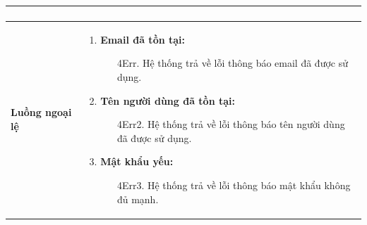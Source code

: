 {\begin{tabularx}{\textwidth}{|>{\raggedright\arraybackslash}p{3.5cm}|>{\raggedright\arraybackslash}X|}
\begin{enumerate}
\begin{enumerate}
    \end{enumerate}
\end{enumerate} \\
\hline
\textbf{Luồng ngoại lệ} &
\begin{enumerate}
    \item \textbf{Email đã tồn tại:}
    \begin{enumerate}
        \item[4Err.] Hệ thống trả về lỗi thông báo email đã được sử dụng.
    \end{enumerate}
    \item \textbf{Tên người dùng đã tồn tại:}
    \begin{enumerate}
        \item[4Err2.] Hệ thống trả về lỗi thông báo tên người dùng đã được sử dụng.
    \end{enumerate}
    \item \textbf{Mật khẩu yếu:}
    \begin{enumerate}
        \item[4Err3.] Hệ thống trả về lỗi thông báo mật khẩu không đủ mạnh.
    \end{enumerate}
\end{enumerate} \\
\hline
\end{tabularx}
}
